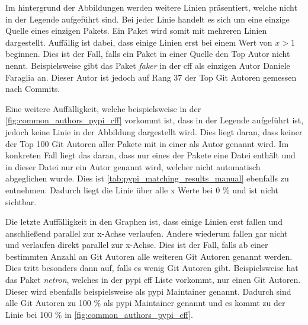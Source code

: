 Im hintergrund der Abbildungen werden weitere Linien präsentiert, welche nicht in der Legende aufgeführt sind.
Bei jeder Linie handelt es sich um eine einzige Quelle eines einzigen Pakets.
Ein Paket wird somit mit mehreren Linien dargestellt.
Auffällig ist dabei, dass einige Linien erst bei einem Wert von $x>1$ beginnen.
Dies ist der Fall, falls ein Paket in einer Quelle den Top Autor nicht nennt.
Beispielsweise gibt das Paket \emph{faker} in der \gls{cff} als einzigen Autor \glqq Daniele Faraglia\grqq{} an.
Dieser Autor ist jedoch auf Rang 37 der Top Git Autoren gemessen nach Commits.

Eine weitere Auffälligkeit, welche beispielsweise in der \autoref{fig:common_authors_pypi_cff} vorkommt ist, dass in der Legende  aufgeführt ist, jedoch keine Linie in der Abbildung dargestellt wird.
Dies liegt daran, dass keiner der Top 100 Git Autoren aller Pakete mit  in einer  als Autor genannt wird.
Im konkreten Fall liegt das daran, dass nur eines der Pakete eine  Datei enthält und in dieser Datei nur ein Autor genannt wird, welcher nicht automatisch abgeglichen wurde.
Dies ist \autoref{tab:pypi_matching_results_manual} ebenfalls zu entnehmen.
Dadurch liegt die Linie über alle x Werte bei 0 \% und ist nicht sichtbar.

Die letzte Auffälligkeit in den Graphen ist, dass einige Linien erst fallen und anschließend parallel zur x-Achse verlaufen.
Andere wiederum fallen gar nicht und verlaufen direkt parallel zur x-Achse.
Dies ist der Fall, falls ab einer bestimmten Anzahl an Git Autoren alle weiteren Git Autoren genannt werden.
Dies tritt besonders dann auf, falls es wenig Git Autoren gibt.
Beispielsweise hat das Paket \emph{netron}, welches in der \gls{pypi} \gls{cff} Liste vorkommt, nur einen Git Autoren.
Dieser wird ebenfalls beispielsweise als \gls{pypi} Maintainer genannt.
Dadurch sind alle Git Autoren zu 100 \% als \gls{pypi} Maintainer genannt und es kommt zu der Linie bei 100 \% in \autoref{fig:common_authors_pypi_cff}.

